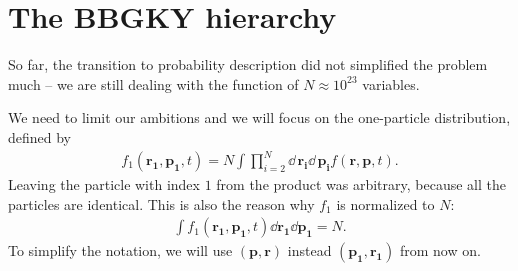 \section{The BBGKY hierarchy}
So far, the transition to probability description did not simplified the problem much -- we are still dealing with the function of $N \approx 10^{23}$ variables.

We need to limit our ambitions and we will focus on the one-particle distribution, defined by
\begin{align} \label{1pd}
f_1(\bm{r_1},\bm{p_1},t) = N \int \prod_{i=2}^N \dd \, \bm{r_i} \dd \, \bm{p_i}
 f(\bm{r},\bm{p},t).
\end{align}
Leaving the particle with index $1$ from the product was arbitrary, because all the particles are identical. This is also the reason why $f_1$ is normalized to $N$:
\begin{align*}
\int f_1(\bm{r_1},\bm{p_1},t) \dd \bm{r_1} \dd \bm{p_1} = N.
\end{align*}
To simplify the notation, we will use $(\bm{p},\bm{r})$ instead $(\bm{p_1},\bm{r_1})$ from now on.


